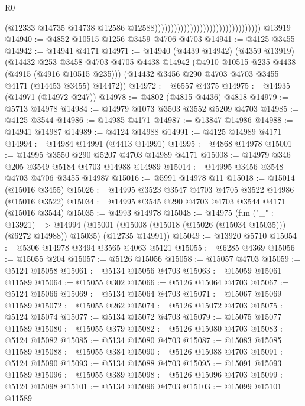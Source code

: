 \begin{lexlean}{R0}
\begin{coremodule}
                                                                    (@12333
                                                                      @14735
                                                                      @14738
                                                                      @12586
                                                                      @12588)))))))))))))))))))))))))))))))))
    @13919
@14940 := @4852 @10515 @1256 @3459 @4706 @4703
@14941 := @4125 @3455
@14942 := @14941 @4171
@14971 := @14940
    (@4439 @14942)
    (@4359 @13919)
    (@14432
      @253
      @3458
      @4703
      @4705
      @4438
      @14942
      (@4910 @10515 @235 @4438 (@4915 (@4916 @10515 @235)))
      (@14432 @3456 @290 @4703 @4703 @3455 @4171 (@14453 @3455) @14472))
@14972 := @6557 @4375
@14975 := @14935 (@14971 (@14972 @247))
@14978 := @4802 (@4815 @4436) @4818
@14979 := @5713 @14978
@14984 := @14979 @1073 @3503 @3552 @5209 @4703
@14985 := @4125 @3544
@14986 := @14985 @4171
@14987 := @13847 @14986
@14988 := @14941 @14987
@14989 := @4124 @14988
@14991 := @4125 @14989 @4171
@14994 := @14984 @14991 (@4413 @14991)
@14995 := @4868 @14978
@15001 := @14995 @3550 @290 @5207 @4703 @14989 @4171
@15008 := @14979 @346 @205 @3549 @5184 @4703 @14988 @14989
@15014 := @14995 @3456 @3548 @4703 @4706 @3455 @14987
@15016 := @5991 @14978 @11
@15018 := @15014 (@15016 @3455)
@15026 := @14995 @3523 @3547 @4703 @4705 @3522 @14986 (@15016 @3522)
@15034 := @14995 @3545 @290 @4703 @4703 @3544 @4171 (@15016 @3544)
@15035 := @4993 @14978
@15048 := @14975
    (fun ("_" : @13921) =>
    @14994
      (@15001 (@15008 (@15018 (@15026 (@15034 @15035))) (@6272 @14988)) @15035)
      (@12735 @14991))
@15049 := @13920 @5710
@15054 := @5306 @14978 @3494 @3565 @4063 @5121
@15055 := @6285 @4369
@15056 := @15055 @204
@15057 := @5126 @15056
@15058 := @15057 @4703
@15059 := @5124 @15058
@15061 := @5134 @15056 @4703
@15063 := @15059 @15061 @11589
@15064 := @15055 @302
@15066 := @5126 @15064 @4703
@15067 := @5124 @15066
@15069 := @5134 @15064 @4703
@15071 := @15067 @15069 @11589
@15072 := @15055 @262
@15074 := @5126 @15072 @4703
@15075 := @5124 @15074
@15077 := @5134 @15072 @4703
@15079 := @15075 @15077 @11589
@15080 := @15055 @379
@15082 := @5126 @15080 @4703
@15083 := @5124 @15082
@15085 := @5134 @15080 @4703
@15087 := @15083 @15085 @11589
@15088 := @15055 @384
@15090 := @5126 @15088 @4703
@15091 := @5124 @15090
@15093 := @5134 @15088 @4703
@15095 := @15091 @15093 @11589
@15096 := @15055 @389
@15098 := @5126 @15096 @4703
@15099 := @5124 @15098
@15101 := @5134 @15096 @4703
@15103 := @15099 @15101 @11589

\end{coremodule}
\end{lexlean}
